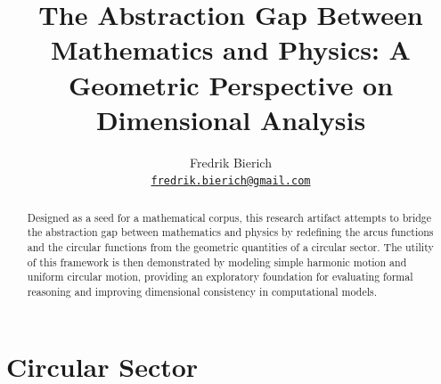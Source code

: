 \documentclass[a4paper,12pt]{report}
\title{The Abstraction Gap Between Mathematics and Physics: A Geometric Perspective on Dimensional Analysis}
\author{Fredrik Bierich \orcidlink{https://orcid.org/0009-0008-0263-0950} \\ \href{mailto:fredrik.bierich@gmail.com}{\texttt{fredrik.bierich@gmail.com}}}
\begin{document}
\maketitle
\begin{abstract}
Designed as a seed for a mathematical corpus, this research artifact attempts to bridge the abstraction gap between mathematics and physics by redefining the arcus functions and the circular functions from the geometric quantities of a circular sector. The utility of this framework is then demonstrated by modeling simple harmonic motion and uniform circular motion, providing an exploratory foundation for evaluating formal reasoning and improving dimensional consistency in computational models.
\end{abstract}
\section{Circular Sector}
\end{document}
